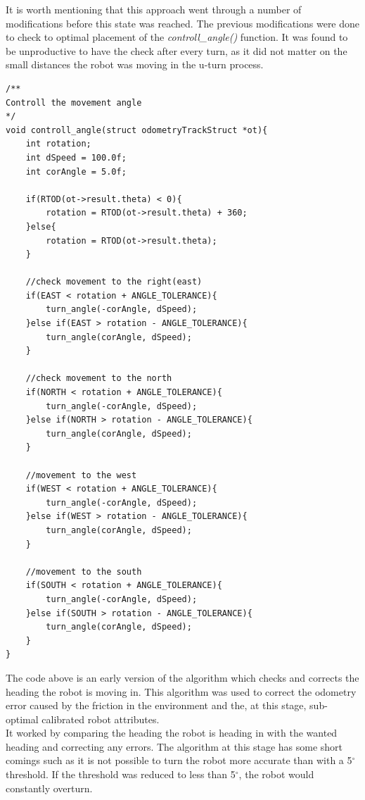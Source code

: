 It is worth mentioning that this approach went through a number of modifications before this state was reached. The previous modifications were done to check to optimal placement of the \textit{controll\_angle()} function. It was found to be unproductive to have the check after every turn, as it did not matter on the small distances the robot was moving in the u-turn process. \\

\begin{lstlisting}[caption={Early heading correction algorithm}, label={early_heading}]
/**
Controll the movement angle
*/
void controll_angle(struct odometryTrackStruct *ot){
    int rotation;
    int dSpeed = 100.0f;
    int corAngle = 5.0f;

    if(RTOD(ot->result.theta) < 0){
        rotation = RTOD(ot->result.theta) + 360;
    }else{
        rotation = RTOD(ot->result.theta);
    }

    //check movement to the right(east)
    if(EAST < rotation + ANGLE_TOLERANCE){
        turn_angle(-corAngle, dSpeed);
    }else if(EAST > rotation - ANGLE_TOLERANCE){
        turn_angle(corAngle, dSpeed);
    }

    //check movement to the north
    if(NORTH < rotation + ANGLE_TOLERANCE){
        turn_angle(-corAngle, dSpeed);
    }else if(NORTH > rotation - ANGLE_TOLERANCE){
        turn_angle(corAngle, dSpeed);
    }

    //movement to the west
    if(WEST < rotation + ANGLE_TOLERANCE){
        turn_angle(-corAngle, dSpeed);
    }else if(WEST > rotation - ANGLE_TOLERANCE){
        turn_angle(corAngle, dSpeed);
    }

    //movement to the south
    if(SOUTH < rotation + ANGLE_TOLERANCE){
        turn_angle(-corAngle, dSpeed);
    }else if(SOUTH > rotation - ANGLE_TOLERANCE){
        turn_angle(corAngle, dSpeed);
    }
}
\end{lstlisting}
The code above is an early version of the algorithm which checks and corrects the heading the robot is moving in. This algorithm was used to correct the odometry error caused by the friction in the environment and the, at this stage, sub-optimal calibrated robot attributes. \\
It worked by comparing the heading the robot is heading in with the wanted heading and correcting any errors. The algorithm at this stage has some short comings such as it is not possible to turn the robot more accurate than with a 5$^{\circ}$ threshold. If the threshold was reduced to less than  5$^{\circ}$, the robot would constantly overturn. \\[3ex]

